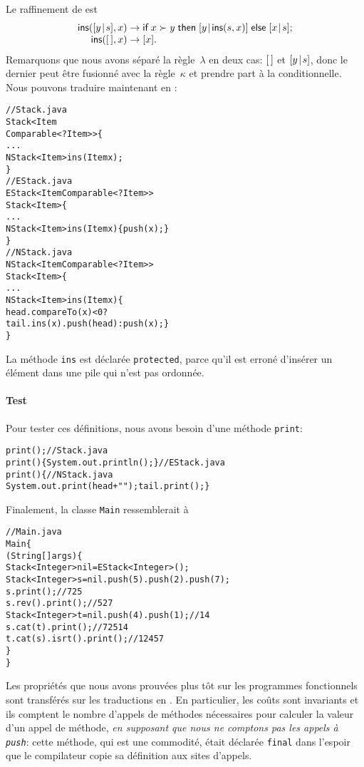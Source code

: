 Le raffinement de  est
\begin{equation*}
\begin{array}{@{}r@{\;}l@{\;}l@{}}
\fun{ins}(\cons{y}{s},x) & \rightarrow & \fun{if} \; x \succ y \;
\fun{then} \; \cons{y}{\fun{ins}(s,x)} \; \fun{else} \; \cons{x}{s};\\
\fun{ins}(\el,x) & \rightarrow & [x].
\end{array}
\end{equation*}
Remarquons que nous avons séparé la règle~\(\lambda\) en deux cas:
\([\,]\) et \([{y}\!\mid\!{s}]\), donc le dernier peut être fusionné avec la
règle~\(\kappa\) et prendre part à la conditionnelle. Nous pouvons
traduire maintenant en \Java:
\begin{alltt}
// Stack.java
\public \abstractX \class Stack<Item
\hfill\extends Comparable<? \super Item>> \{
  ...
  \protectedX \abstractX NStack<Item> ins(\final Item x);
\}
// EStack.java
\public \class EStack<Item \extends Comparable<? \super Item>> 
       \extends Stack<Item> \{
  ...
  \protectedX NStack<Item> ins(\final Item x) \{\return push(x);\}
\}
// NStack.java
\public \class NStack<Item \extends Comparable<? \super Item>>
       \extends Stack<Item> \{
  ...
  \protectedX NStack<Item> ins(\final Item x) \{
    \return head.compareTo(x) < 0 ? 
           tail.ins(x).push(head) : push(x); \}
\}
\end{alltt}
La méthode \texttt{ins} est déclarée \texttt{protected}, parce qu'il
est erroné d'insérer un élément dans une pile qui n'est pas ordonnée.

\paragraph{Test}

Pour tester ces définitions, nous avons besoin d'une méthode
\texttt{print}:
\begin{alltt}
\public \abstractX \void print();\hfill// Stack.java
\public \void print() \{ System.out.println(); \}\hfill// EStack.java
\public \void print() \{\hfill// NStack.java
  System.out.print(head + " "); tail.print(); \}
\end{alltt}
Finalement, la classe \texttt{Main} ressemblerait à
\begin{alltt}
// Main.java
\public \class Main \{
  \public \static \void \main (String[] args) \{
    Stack<Integer> nil = \new EStack<Integer>();
    Stack<Integer> s = nil.push(5).push(2).push(7);
    s.print();\hfill// 7 2 5
    s.rev().print();\hfill// 5 2 7
    Stack<Integer> t = nil.push(4).push(1);\hfill// 1 4
    s.cat(t).print();\hfill// 7 2 5 1 4
    t.cat(s).isrt().print();\hfill// 1 2 4 5 7
  \}
\}
\end{alltt}
Les propriétés que nous avons prouvées plus tôt sur les programmes
fonctionnels sont transférés sur les traductions en \Java. En
particulier, les coûts sont invariants et ils comptent le nombre
d'appels de méthodes nécessaires pour calculer la valeur d'un appel de
méthode, \emph{en supposant que nous ne comptons pas les appels à
  \texttt{push}}: cette méthode, qui est une commodité, était déclarée
\texttt{final} dans l'espoir que le compilateur copie sa définition
aux sites d'appels.


